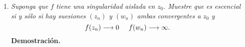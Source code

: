 \documentclass[10pt,a5paper]{article}
\begin{document}
\begin{enumerate}
	\item \textit{Suponga que \(f\) tiene una singularidad aislada en \(z_0\). Muestre que es escencial si y sólo si hay suesiones \((z_n)\) y \((w_n)\) ambas convergentes a \(z_0\) y}
		\[
			f(z_n) \longrightarrow 0 \hspace{5mm} f(w_n) \longrightarrow \infty .
		\]
		\textbf{Demostración.} 

\end{enumerate}
\end{document}

